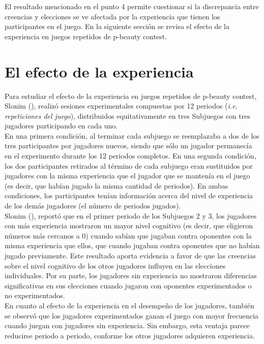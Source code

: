 El resultado mencionado en el punto 4 permite cuestionar si la discrepancia entre creencias y elecciones se ve afectada por la experiencia que tienen los participantes en el juego.  En la siguiente sección se revisa el efecto de la experiencia en juegos repetidos de p-beauty contest.\\

\section{El efecto de la experiencia}

Para estudiar el efecto de la experiencia en juegos repetidos de p-beauty contest, Slonim (\citeyear{Slonim}), realizó sesiones experimentales compuestas por 12 periodos (\textit{i.e. repeticiones del juego}), distribuidos equitativamente en tres Subjuegos con tres jugadores participando en cada uno.\\

En una primera condición, al terminar cada subjuego se reemplazaba a dos de los tres participantes por jugadores nuevos, siendo que sólo un jugador permanecía en el experimento durante los 12 periodos completos. En una segunda condición, los dos participantes retirados al término de cada subjuego eran sustituidos por jugadores con la misma experiencia que el jugador que se mantenía en el juego (es decir, que habían jugado la misma cantidad de periodos). En ambas condiciones, los participantes tenían información acerca del nivel de experiencia de los demás jugadores (el número de periodos jugados).\\

Slonim (\citeyear{Slonim}), reportó que en el primer periodo de los Subjuegos 2 y 3, los jugadores con más experiencia mostraron un mayor nivel cognitivo (es decir, que eligieron números más cercanos a 0) cuando sabían que jugaban contra oponentes con la misma experiencia que ellos, que cuando jugaban contra oponentes que no habían jugado previamente. Este resultado aporta evidencia a favor de que las creencias sobre el nivel cognitivo de los otros jugadores influyen en las elecciones individuales. Por su parte, los jugadores sin experiencia no mostraron diferencias signiﬁcativas en sus elecciones cuando jugaron con oponentes experimentados o no experimentados.\\

En cuanto al efecto de la experiencia en el desempeño de los jugadores, también se observó que los jugadores experimentados ganan el juego con mayor frecuencia cuando juegan con jugadores sin experiencia. Sin embargo, esta ventaja parece reducirse periodo a periodo, conforme los otros jugadores adquieren experiencia.\\

